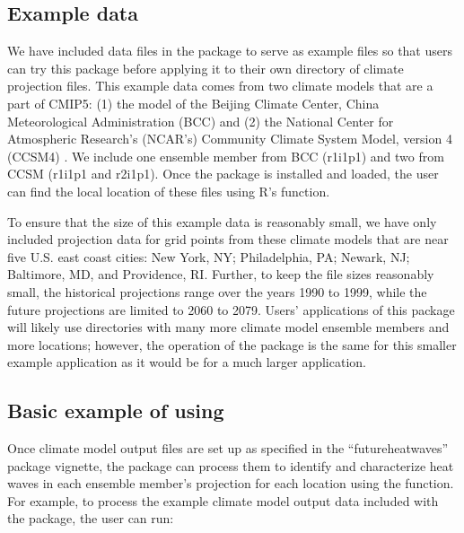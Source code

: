 \subsection{Example data}\label{example-data}

We have included data files in the package to serve as example files so
that users can try this package before applying it to their own
directory of climate projection files. This example data comes from two
climate models that are a part of CMIP5: (1) the model of the Beijing
Climate Center, China Meteorological Administration (BCC)
\citep{xin2013introduction} and (2) the National Center for Atmospheric
Research's (NCAR's) Community Climate System Model, version 4 (CCSM4)
\citep{gent2011community}. We include one ensemble member from BCC
(r1i1p1) and two from CCSM (r1i1p1 and r2i1p1). Once the
 package is installed and loaded, the user can find
the local location of these files using R's  function.

To ensure that the size of this example data is reasonably small, we
have only included projection data for grid points from these climate
models that are near five U.S. east coast cities: New York, NY;
Philadelphia, PA; Newark, NJ; Baltimore, MD, and Providence, RI.
Further, to keep the file sizes reasonably small, the historical
projections range over the years 1990 to 1999, while the future
projections are limited to 2060 to 2079. Users' applications of this
package will likely use directories with many more climate model
ensemble members and more locations; however, the operation of the
package is the same for this smaller example application as it would be
for a much larger application.

\subsection{\texorpdfstring{Basic example of using
}{Basic example of using }}\label{basic-example-of-using}

Once climate model output files are set up as specified in the
``futureheatwaves'' package vignette, the package can process them to
identify and characterize heat waves in each ensemble member's
projection for each location using the  function. For
example, to process the example climate model output data included with
the package, the user can run:

